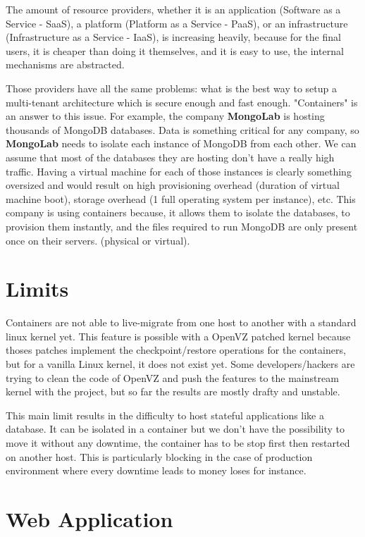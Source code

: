 The amount of resource providers, whether it is an application (Software as a
Service - SaaS), a platform (Platform as a Service - PaaS), or an
infrastructure (Infrastructure as a Service - IaaS), is increasing heavily,
because for the final users, it is cheaper than doing it themselves, and it is
easy to use, the internal mechanisms are abstracted.

Those providers have all the same problems: what is the best way to setup a
multi-tenant architecture which is secure enough and fast enough. "Containers"
is an answer to this issue. For example, the company \textbf{MongoLab} is hosting
thousands of MongoDB databases. Data is something critical for any company, so
\textbf{MongoLab} needs to isolate each instance of MongoDB from each other.
We can assume that most of the databases they are hosting don't have a really high
traffic. Having a virtual machine for each of those instances is clearly something
oversized and would result on high provisioning overhead (duration of virtual
machine boot), storage overhead (1 full operating system per instance), etc.
This company is using containers because, it allows them to isolate the databases,
to provision them instantly, and the files required to run MongoDB are
only present once on their servers. (physical or virtual).

\section{Limits}

Containers are not able to live-migrate from one host to another with a
standard linux kernel yet. This feature is possible with a OpenVZ patched
kernel because thoses patches implement the checkpoint/restore operations for
the containers, but for a vanilla Linux kernel, it does not exist yet. Some
developers/hackers are trying to clean the code of OpenVZ and push the features
to the mainstream kernel with the \cite{websiteCRIU} project, but so far the
results are mostly drafty and unstable.

This main limit results in the difficulty to host stateful applications like a
database. It can be isolated in a container but we don't have the possibility
to move it without any downtime, the container has to be stop first then
restarted on another host. This is particularly blocking in the case of
production environment where every downtime leads to money loses for instance.

\section{Web Application}

